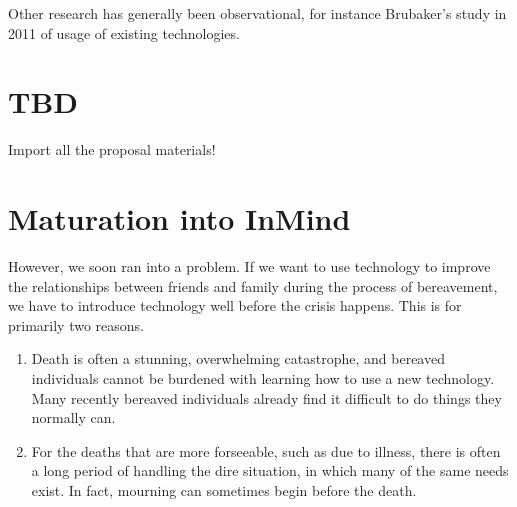   Other research has generally been observational, for instance Brubaker's study
  in 2011 of usage of existing technologies. \cite{brubaker11}

\section{TBD}
Import all the proposal materials!

\section{Maturation into InMind}
  However, we soon ran into a problem.
  If we want to use technology to improve the relationships between friends and family during the
  process of bereavement, we have to introduce technology well before the crisis happens.
  This is for primarily two reasons.
  \begin{enumerate}
  \item Death is often a stunning, overwhelming catastrophe,
  and bereaved individuals cannot be burdened with learning how to use a new technology.
  Many recently bereaved individuals already find it difficult to do things they normally can. \cite{??}
  \item For the deaths that are more forseeable, such as due to illness,
  there is often a long period of handling the dire situation,
  in which many of the same needs exist.
  In fact, mourning can sometimes begin before the death. \cite{??}
  \end{enumerate}

\clearpage
\newpage
